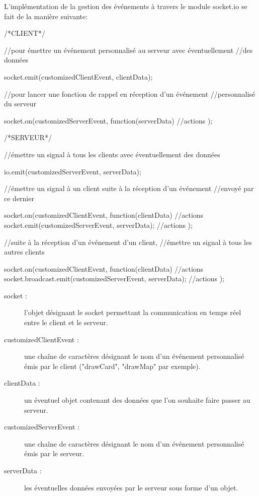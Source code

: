 \documentclass[12pt]{report}
\begin{document}
	L'implémentation de la gestion des événements à travers le module socket.io se fait de la manière suivante:

	\begin{verbatimtab}[4]
	/*CLIENT*/

	//pour émettre un événement personnalisé au serveur avec éventuellement
	//des données

	socket.emit(customizedClientEvent, clientData);

	//pour lancer une fonction de rappel en réception d'un événement
	//personnalisé du serveur

	socket.on(customizedServerEvent, function(serverData){
		//actions
	});

	/*SERVEUR*/

	//émettre un signal à tous les clients avec éventuellement des données

	io.emit(customizedServerEvent, serverData);

	//émettre un signal à un client suite à la réception d'un événement
	//envoyé par ce dernier

	socket.on(customizedClientEvent, function(clientData){
		//actions
		socket.emit(customizedServerEvent, serverData);
		//actions
	});

	//suite à la réception d'un événement d'un client,
	//émettre un signal à tous les autres clients

	socket.on(customizedClientEvent, function(clientData){
		//actions
		socket.broadcast.emit(customizedServerEvent, serverData);
		//actions
	});
	\end{verbatimtab}

	\begin{description}
		\item [socket :]{
			l'objet désignant le socket permettant la communication en temps réel entre le client et le serveur.
		}
		\item [customizedClientEvent :]{
			une chaîne de caractères désignant le nom d'un événement personnalisé émis par le client ("drawCard", "drawMap" par exemple).
		}
		\item [clientData :]{
			un éventuel objet contenant des données que l'on souhaite faire passer au serveur.
		}
		\item [customizedServerEvent :]{
			une chaîne de caractères désignant le nom d'un événement personnalisé émis par le serveur.
		}
		\item [serverData :]{
			les éventuelles données envoyées par le serveur sous forme d'un objet.
		}
	\end{description}
\end{document}
